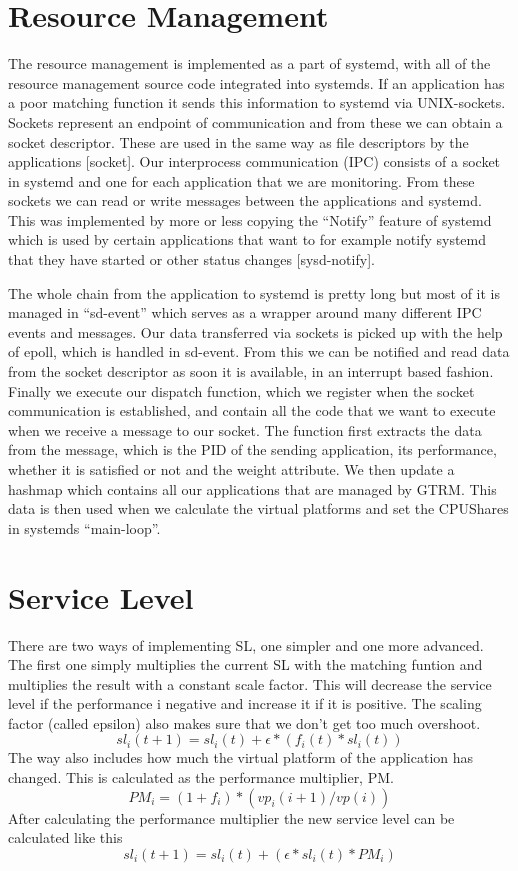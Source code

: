\documentclass[nobiblatex]{LTHthesis}
\begin{document}
\section{Resource Management} 
The resource management is implemented as a part of systemd, with all of the resource management source code integrated into systemds. If an application has a poor matching function it sends this information to systemd via UNIX-sockets. Sockets represent an endpoint of communication and from these we can obtain a socket descriptor. These are used in the same way as file descriptors by the applications [socket]. Our interprocess communication (IPC) consists of a socket in systemd and one for each application that we are monitoring. From these sockets we can read or write messages between the applications and systemd. This was implemented by more or less copying the “Notify” feature of systemd which is used by certain applications that want to for example notify systemd that they have started or other status changes [sysd-notify].

The whole chain from the application to systemd is pretty long but most of it is managed in “sd-event” which serves as a wrapper around many different IPC events and messages. Our data transferred via sockets is picked up with the help of epoll, which is handled in sd-event. From this we can be notified and read data from the socket descriptor as soon it is available, in an interrupt based fashion. Finally we execute our dispatch function, which we register when the socket communication is established, and contain all the code that we want to execute when we receive a message to our socket. The function first extracts the data from the message, which is the PID of the sending application, its performance, whether it is satisfied or not and the weight attribute. We then update a hashmap which contains all our applications that are managed by GTRM. This data is then used when we calculate the virtual platforms and set the CPUShares in systemds “main-loop”.

\section{Service Level}
There are two ways of implementing SL, one simpler and one more advanced. The first one simply multiplies the current SL with the matching funtion and multiplies the result with a constant scale factor. This will decrease the service level if the performance i negative and increase it if it is positive. The scaling factor (called epsilon) also makes sure that we don't get too much overshoot. 
\[sl_i(t+1)= sl_i(t) + \epsilon*(f_i(t)*sl_i(t)) \]
The way also includes how much the virtual platform of the application has changed. This is calculated as the performance multiplier, PM.
\[PM_i = (1+f_i)*(vp_i(i+1)/vp(i))\]
After calculating the performance multiplier the new service level can be calculated like this
\[sl_i(t+1)=sl_i(t) + (\epsilon*sl_i(t)*PM_i)\]
\end{document}
